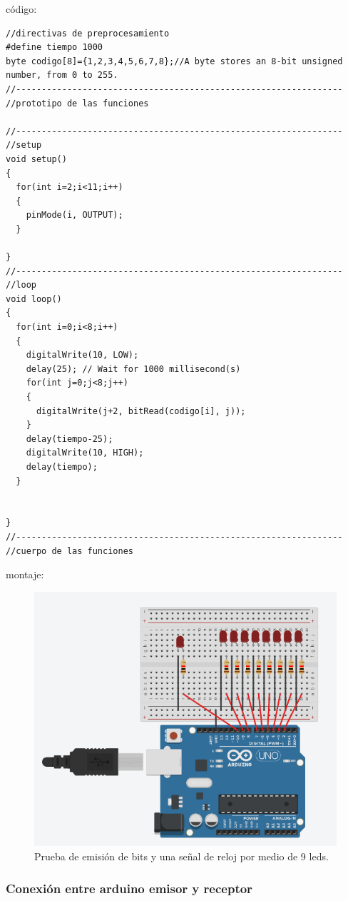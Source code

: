 \documentclass{article}
\begin{document}
código:
\begin{lstlisting}[style=myArduino]//directivas de preprocesamiento
#define tiempo 1000
byte codigo[8]={1,2,3,4,5,6,7,8};//A byte stores an 8-bit unsigned number, from 0 to 255.
//----------------------------------------------------------------
//prototipo de las funciones

//----------------------------------------------------------------
//setup
void setup()
{
  for(int i=2;i<11;i++)
  {
    pinMode(i, OUTPUT);
  }
  
}
//----------------------------------------------------------------
//loop
void loop()
{
  for(int i=0;i<8;i++)
  {
  	digitalWrite(10, LOW);
  	delay(25); // Wait for 1000 millisecond(s)
    for(int j=0;j<8;j++)
    {
      digitalWrite(j+2, bitRead(codigo[i], j));
    }
    delay(tiempo-25);
    digitalWrite(10, HIGH);
    delay(tiempo);
  }
  
  
}
//----------------------------------------------------------------
//cuerpo de las funciones
\end{lstlisting}

montaje:
\begin{figure}[h]
\includegraphics[scale=0.6]{emisor1.png}
\centering
\caption{Prueba de emisión de bits y una señal de reloj por medio de 9 leds.}
\label{fig:emisor1}
\end{figure}

\newpage
\subsubsection{Conexión entre arduino emisor y receptor}\label{intento1}
\end{document}
